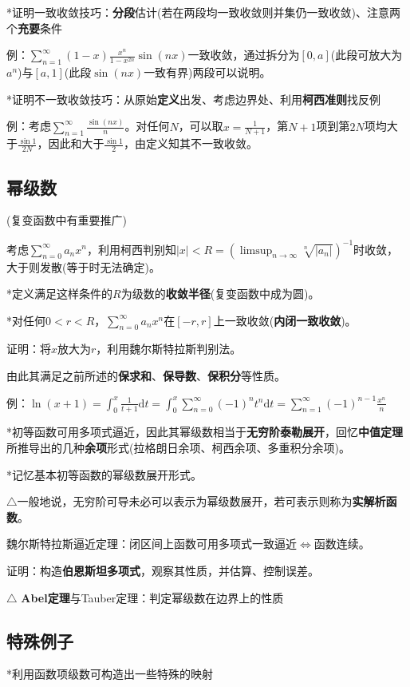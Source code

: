 \documentclass[a4paper,UTF8]{ctexart}
\begin{document}
*证明一致收敛技巧：\textbf{分段}估计(若在两段均一致收敛则并集仍一致收敛)、注意两个\textbf{充要}条件

例：$\sum_{n=1}^\infty(1-x)\frac{x^n}{1-x^{2n}}\sin(nx)$一致收敛，通过拆分为$[0,a]$(此段可放大为$a^n$)与$[a,1]$(此段$\sin(nx)$一致有界)两段可以说明。

*证明不一致收敛技巧：从原始\textbf{定义}出发、考虑边界处、利用\textbf{柯西准则}找反例

例：考虑$\sum_{n=1}^\infty\frac{\sin(nx)}{n}$。对任何$N$，可以取$x=\frac{1}{N+1}$，第$N+1$项到第$2N$项均大于$\frac{\sin1}{2N}$，因此和大于$\frac{\sin1}{2}$，由定义知其不一致收敛。

\subsection{幂级数}

(复变函数中有重要推广)

考虑$\sum_{n=0}^\infty a_nx^n$，利用柯西判别知$|x|<R=(\limsup_{n\to\infty}\sqrt[n]{|a_n|})^{-1}$时收敛，大于则发散(等于时无法确定)。

*定义满足这样条件的$R$为级数的\textbf{收敛半径}(复变函数中成为圆)。

*对任何$0<r<R$，$\sum_{n=0}^\infty a_nx^n$在$[-r,r]$上一致收敛(\textbf{内闭一致收敛})。

证明：将$x$放大为$r$，利用魏尔斯特拉斯判别法。

由此其满足之前所述的\textbf{保求和}、\textbf{保导数}、\textbf{保积分}等性质。

例：$\ln(x+1)=\int_0^x\frac{1}{t+1}\mathrm{d}t=\int_0^x\sum_{n=0}^\infty(-1)^nt^n\mathrm{d}t=\sum_{n=1}^\infty(-1)^{n-1}\frac{x^n}{n}$

*初等函数可用多项式逼近，因此其幂级数相当于\textbf{无穷阶泰勒展开}，回忆\textbf{中值定理}所推导出的几种\textbf{余项}形式(拉格朗日余项、柯西余项、多重积分余项)。

*记忆基本初等函数的幂级数展开形式。

$\triangle$一般地说，无穷阶可导未必可以表示为幂级数展开，若可表示则称为\textbf{实解析函数}。

魏尔斯特拉斯逼近定理：闭区间上函数可用多项式一致逼近$\Leftrightarrow$函数连续。

证明：构造\textbf{伯恩斯坦多项式}，观察其性质，并估算、控制误差。

$\triangle$ \textbf{Abel定理}与Tauber定理：判定幂级数在边界上的性质

\subsection{特殊例子}
*利用函数项级数可构造出一些特殊的映射
\end{document}
